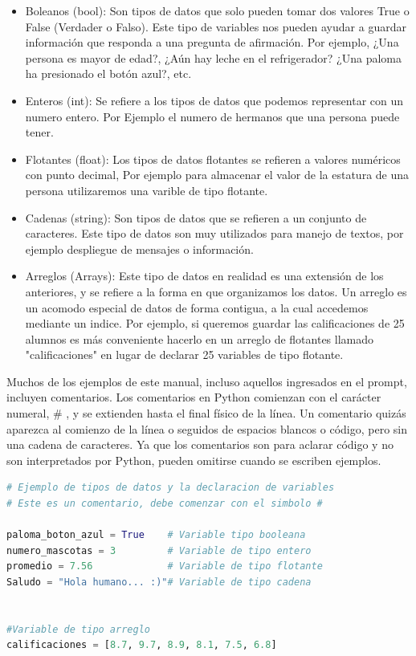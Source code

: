 \documentclass[a4paper, openright, 12pt]{article}
\begin{document}
        \begin{itemize}
          \item{Boleanos (bool): Son tipos de datos que solo pueden tomar dos valores True o False (Verdader o Falso). Este tipo de variables nos pueden ayudar a guardar información que responda a una pregunta de afirmación. Por ejemplo, ¿Una persona es mayor de edad?, ¿Aún hay leche en el refrigerador? ¿Una paloma ha presionado el botón azul?, etc.}
          \item{Enteros (int): Se refiere a los tipos de datos que podemos representar con un numero entero. Por Ejemplo el numero de hermanos que una persona puede tener.}
          \item{Flotantes (float): Los tipos de datos flotantes se refieren a valores numéricos con punto decimal, Por ejemplo para almacenar el valor de la estatura de una persona utilizaremos una varible de tipo flotante.}
          \item{Cadenas (string): Son tipos de datos que se refieren a un conjunto de caracteres. Este tipo de datos son muy utilizados para manejo de textos, por ejemplo despliegue de mensajes o información.}
          \item{Arreglos (Arrays): Este tipo de datos en realidad es una extensión de los anteriores, y se refiere a la forma en que organizamos los datos. Un arreglo es un acomodo especial de datos de forma contigua, a la cual accedemos mediante un indice.
          Por ejemplo, si queremos guardar las calificaciones de 25 alumnos es más conveniente hacerlo en un arreglo de flotantes llamado "calificaciones" en lugar de declarar 25 variables de tipo flotante.}
        \end{itemize}

        Muchos  de  los  ejemplos  de  este  manual,  incluso  aquellos  ingresados  en  el  prompt,  incluyen comentarios.  Los  comentarios  en  Python  comienzan  con  el  carácter  numeral, \# ,  y  se  extienden  hasta  el final  físico  de  la  línea.  Un  comentario  quizás  aparezca  al  comienzo  de  la  línea  o  seguidos  de  espacios blancos  o  código,  pero  sin  una  cadena  de  caracteres. Ya  que  los  comentarios  son  para  aclarar  código  y  no  son interpretados por Python, pueden omitirse cuando se escriben ejemplos.\\

    \begin{lstlisting}[language=Python]
# Ejemplo de tipos de datos y la declaracion de variables
# Este es un comentario, debe comenzar con el simbolo #

paloma_boton_azul = True    # Variable tipo booleana
numero_mascotas = 3         # Variable de tipo entero
promedio = 7.56             # Variable de tipo flotante
Saludo = "Hola humano... :)"# Variable de tipo cadena


#Variable de tipo arreglo
calificaciones = [8.7, 9.7, 8.9, 8.1, 7.5, 6.8]
    \end{lstlisting}
\end{document}
